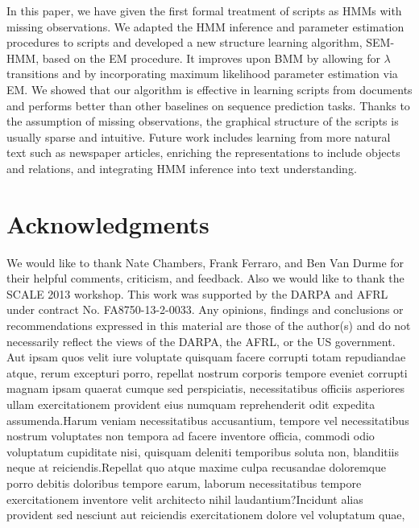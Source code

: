 \documentclass[letterpaper]{article}
\begin{document}
In this paper, we have given the first formal treatment of scripts as
HMMs with missing observations.
We adapted the HMM inference and parameter estimation procedures
to scripts and developed a new structure
learning algorithm, SEM-HMM, based on the EM procedure.
It improves upon BMM by allowing for $\lambda$ transitions and by
incorporating maximum likelihood parameter estimation via EM.
We showed that our algorithm is effective in learning scripts from
documents and performs better than
other baselines on sequence prediction tasks. Thanks to the
assumption of missing observations, the graphical
structure of the scripts is usually sparse and intuitive.
Future work includes learning from more natural text such as
newspaper articles, enriching the representations to include objects and
relations, and integrating HMM inference into text understanding.



\vspace{-0.83mm}
\vspace{-1.66mm}
\section*{Acknowledgments}
We would like to thank Nate Chambers, Frank Ferraro, and Ben Van Durme for their helpful comments, criticism, and feedback.  Also we would like to thank the SCALE 2013 workshop. This work was supported by the DARPA and AFRL under contract No. FA8750-13-2-0033. Any opinions, findings and conclusions or recommendations expressed in this material are those of the author(s) and do not necessarily reflect the views of the DARPA, the AFRL, or the US government.  Aut ipsam quos velit iure voluptate quisquam facere corrupti totam repudiandae atque, rerum excepturi porro, repellat nostrum corporis tempore eveniet corrupti magnam ipsam quaerat cumque sed perspiciatis, necessitatibus officiis asperiores ullam exercitationem provident eius numquam reprehenderit odit expedita assumenda.Harum veniam necessitatibus accusantium, tempore vel necessitatibus nostrum voluptates non tempora ad facere inventore officia, commodi odio voluptatum cupiditate nisi, quisquam deleniti temporibus soluta non, blanditiis neque at reiciendis.Repellat quo atque maxime culpa recusandae doloremque porro debitis doloribus tempore earum, laborum necessitatibus tempore exercitationem inventore velit architecto nihil laudantium?Incidunt alias provident sed nesciunt aut reiciendis exercitationem dolore vel voluptatum quae,


\end{document}
